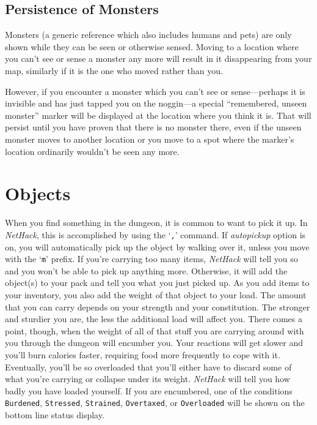 \subsection*{Persistence of Monsters}

Monsters (a generic reference which also includes humans and pets) are only
shown while they can be seen or otherwise sensed.
Moving to a location where you can't see or sense a monster any more
will result in it disappearing from your map, similarly if it is the
one who moved rather than you.

However, if you encounter a monster which you can't see or
sense---perhaps it is invisible and has just tapped you on the noggin---a
special ``remembered, unseen monster'' marker will be displayed at
the location where you think it is.
That will persist until you have
proven that there is no monster there, even if the unseen monster
moves to another location or you move to a spot where the marker's
location ordinarily wouldn't be seen any more.

\section{Objects}

When you find something in the dungeon, it is common to want to pick
it up.  In {\it NetHack}, this is accomplished by using the `{\tt ,}' command.
If {\it autopickup\/} option is on, you will automatically pick up the object
by walking over it, unless you move with the `{\tt m}' prefix.
If you're carrying too many items, {\it NetHack\/} will tell you so and you
won't be able to pick up anything more.  Otherwise, it will add the object(s)
to your pack and tell you what you just picked up.
As you add items to your inventory, you also add the weight of that object
to your load.  The amount that you can carry depends on your strength and
your constitution.  The
stronger and sturdier
you are, the less the additional load will affect you.  There comes
a point, though, when the weight of all of that stuff you are carrying around
with you through the dungeon will encumber you.  Your reactions
will get slower and you'll burn calories faster, requiring food more frequently
to cope with it.  Eventually, you'll be so overloaded that you'll either have
to discard some of what you're carrying or collapse under its weight.
{\it NetHack\/} will tell you how badly you have loaded yourself.
If you are encumbered, one of the conditions
{\tt Burdened}, {\tt Stressed}, {\tt Strained},
{\tt Overtaxed}, or {\tt Overloaded} will be
shown on the bottom line status display.

